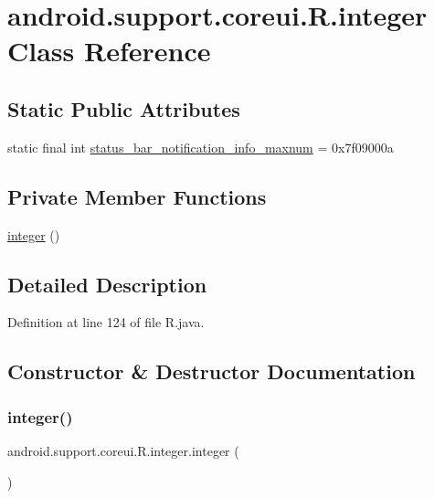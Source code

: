 \hypertarget{classandroid_1_1support_1_1coreui_1_1_r_1_1integer}{}\section{android.\+support.\+coreui.\+R.\+integer Class Reference}
\label{classandroid_1_1support_1_1coreui_1_1_r_1_1integer}
\subsection*{Static Public Attributes}
\begin{DoxyCompactItemize}
\item 
static final int \mbox{\hyperlink{classandroid_1_1support_1_1coreui_1_1_r_1_1integer_ae25c73a19ff7780a6f36e92aa4d65ea4}{status\+\_\+bar\+\_\+notification\+\_\+info\+\_\+maxnum}} = 0x7f09000a
\end{DoxyCompactItemize}
\subsection*{Private Member Functions}
\begin{DoxyCompactItemize}
\item 
\mbox{\hyperlink{classandroid_1_1support_1_1coreui_1_1_r_1_1integer_a4d6296aed84613e4b9794846529a8e1f}{integer}} ()
\end{DoxyCompactItemize}


\subsection{Detailed Description}


Definition at line 124 of file R.\+java.



\subsection{Constructor \& Destructor Documentation}
\mbox{\label{classandroid_1_1support_1_1coreui_1_1_r_1_1integer_a4d6296aed84613e4b9794846529a8e1f}} 
\subsubsection{\texorpdfstring{integer()}{integer()}}
{\footnotesize\ttfamily android.\+support.\+coreui.\+R.\+integer.\+integer (\begin{DoxyParamCaption}{ }\end{DoxyParamCaption})\hspace{0.3cm}{\ttfamily [private]}}



